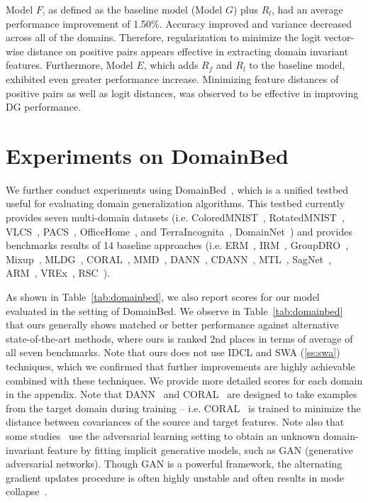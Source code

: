 \documentclass[10pt,twocolumn,letterpaper]{article}
\newcommand{\myparagraph}[1]{\vspace{4pt}\noindent{\bf #1}}
\begin{document}
\myparagraph{Feature and Logit-level Contrastive Losses}
Model $F$, as defined as the baseline model (Model $G$) plus $R_{l}$, had an average performance improvement of 1.50\%. Accuracy improved and variance decreased across all of the domains. Therefore, regularization to minimize the logit vector-wise distance on positive pairs appears effective in extracting domain invariant features. Furthermore, Model $E$, which adds $R_{f}$ and $R_{l}$ to the baseline model, exhibited even greater performance increase. Minimizing feature distances of positive pairs as well as logit distances, was observed to be effective in improving DG performance.


\section{Experiments on DomainBed}\label{sec:domainbed}
We further conduct experiments using DomainBed~\cite{gulrajani2020search}, which is a unified testbed useful for evaluating domain generalization algorithms. This testbed currently provides seven multi-domain datasets (i.e. ColoredMNIST~\cite{arjovsky2019invariant}, RotatedMNIST~\cite{ghifary2015domain}, VLCS~\cite{fang2013unbiased}, PACS~\cite{Li2017dg}, OfficeHome~\cite{venkateswara2017deep}, and TerraIncognita~\cite{beery2018recognition}, DomainNet~\cite{peng2019moment}) and provides benchmarks results of 14 baseline approaches (i.e. ERM~\cite{vapnik1999overview}, IRM~\cite{arjovsky2019invariant}, GroupDRO~\cite{sagawa2019distributionally}, Mixup~\cite{yan2020improve}, MLDG~\cite{li2018learning}, CORAL~\cite{sun2016deep}, MMD~\cite{li2018domain}, DANN~\cite{ganin2016domain}, CDANN~\cite{li2018deep}, MTL~\cite{blanchard2017domain}, SagNet~\cite{nam2019reducing}, ARM~\cite{zhang2020adaptive}, VREx~\cite{krueger2020out}, RSC~\cite{huangRSC2020}). 

As shown in Table~\ref{tab:domainbed}, we also report scores for our model evaluated in the setting of DomainBed. We observe in Table~\ref{tab:domainbed} that ours generally shows matched or better performance against alternative state-of-the-art methods, where ours is ranked 2nd places in terms of average of all seven benchmarks. Note that ours does not use IDCL and SWA (\ref{ss:swa}) techniques, which we confirmed that further improvements are highly achievable combined with these techniques. We provide more detailed scores for each domain in the appendix. Note that DANN~\cite{ganin2016domain} and CORAL~\cite{sun2016deep} are designed to take examples from the target domain during training -- i.e. CORAL~\cite{sun2016deep} is trained to minimize the distance between covariances of the source and target features. Note also that some studies~\cite{nam2019reducing, ganin2016domain, li2018deep} use the adversarial learning setting to obtain an unknown domain-invariant feature by fitting implicit generative models, such as GAN (generative adversarial networks). Though GAN is a powerful framework, the alternating gradient updates procedure is often highly unstable and often results in mode collapse~\cite{kodali2017convergence}.
\end{document}
